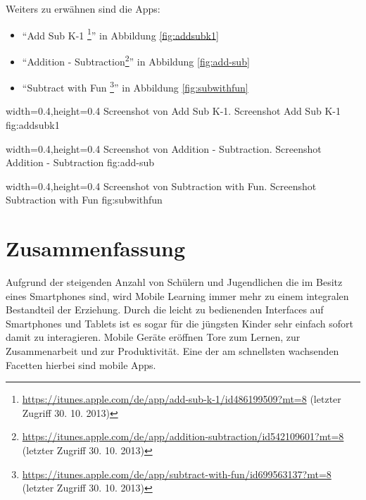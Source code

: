 Weiters zu erwähnen sind die Apps:
\begin{itemize}
\item \enquote{Add Sub K-1 \footnote{\url{https://itunes.apple.com/de/app/add-sub-k-1/id486199509?mt=8} (letzter Zugriff 30. 10. 2013)}}
in Abbildung \ref{fig:addsubk1}
\item \enquote{Addition - Subtraction\footnote{\url{https://itunes.apple.com/de/app/addition-subtraction/id542109601?mt=8} (letzter Zugriff 30. 10. 2013)}}
in Abbildung \ref{fig:add-sub}
\item \enquote{Subtract with Fun \footnote{\url{https://itunes.apple.com/de/app/subtract-with-fun/id699563137?mt=8} (letzter Zugriff 30. 10. 2013)}}
in Abbildung \ref{fig:subwithfun}

\end{itemize}

  {width=0.4\textwidth,height=0.4\textheight}%
  {Screenshot von Add Sub K-1.}%
  {Screenshot Add Sub K-1}%
  {fig:addsubk1}%

  {width=0.4\textwidth,height=0.4\textheight}%
  {Screenshot von Addition - Subtraction.}%
  {Screenshot Addition - Subtraction}%
  {fig:add-sub}%
  
  {width=0.4\textwidth,height=0.4\textheight}%
  {Screenshot von Subtraction with Fun.}%
  {Screenshot Subtraction with Fun}%
  {fig:subwithfun}%

\section{Zusammenfassung}

Aufgrund der steigenden Anzahl von Schülern und Jugendlichen die im Besitz eines Smartphones sind, 
wird Mobile Learning immer mehr zu einem integralen Bestandteil der Erziehung. Durch die leicht zu 
bedienenden Interfaces auf Smartphones und Tablets ist es sogar für die jüngsten Kinder sehr einfach
sofort damit zu interagieren. Mobile Geräte eröffnen Tore zum Lernen, zur Zusammenarbeit und zur 
Produktivität. Eine der am schnellsten wachsenden Facetten hierbei sind mobile Apps.

